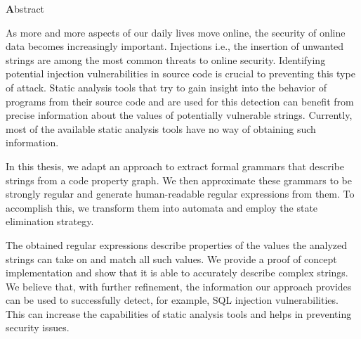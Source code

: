 \vspace*{2cm}

\begin{center}
{ \textbf Abstract}
\end{center}
\noindent

As more and more aspects of our daily lives move online, the security of online data becomes increasingly important. Injections \textendash{} i.e., the insertion of unwanted strings \textendash{} are among the most common threats to online security. Identifying potential injection vulnerabilities in source code is crucial to preventing this type of attack. Static analysis tools that try to gain insight into the behavior of programs from their source code and are used for this detection can benefit from precise information about the values of potentially vulnerable strings. Currently, most of the available static analysis tools have no way of obtaining such information.

In this thesis, we adapt an approach to extract formal grammars that describe strings from a code property graph. 
We then approximate these grammars to be strongly regular and generate human-readable regular expressions from them. To accomplish this, we transform them into automata and employ the state elimination strategy.

The obtained regular expressions describe properties of the values the analyzed strings can take on and match all such values.
We provide a proof of concept implementation and show that it is able to accurately describe complex strings. We believe that, with further refinement, the information our approach provides can be used to successfully detect, for example, SQL injection vulnerabilities. This can increase the capabilities of static analysis tools and helps in preventing security issues.
